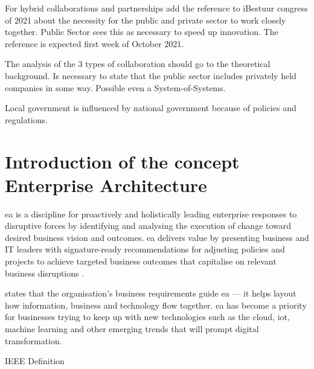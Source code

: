 \begin{remark}
	For hybrid collaborations and partnerships add the reference to iBestuur congress of 2021 about the necessity for the public and private sector to work closely together. Public Sector sees this as necessary to speed up innovation. The reference is expected first week of October 2021.
\end{remark}

\begin{remark}
	The analysis of the 3 types of collaboration should go to the theoretical background. Is necessary to state that the public sector includes privately held companies in some way. Possible even a System-of-Systems.
\end{remark}

\begin{remark}
	Local government is influenced by national government because of policies and regulations.
\end{remark}

\section{Introduction of the concept Enterprise Architecture}
\label{introea}
\acrfull{ea} is a discipline for proactively and holistically leading enterprise responses to disruptive forces by identifying and analysing the execution of change toward desired business vision and outcomes. \acrshort{ea} delivers value by presenting business and IT leaders with signature-ready recommendations for adjusting policies and projects to achieve targeted business outcomes that capitalise on relevant business disruptions \parencite{Gartner}.

\textcite{White2018} states that the organisation’s business requirements guide \acrshort{ea} — it helps layout how information, business and technology flow together. \acrshort{ea} has become a priority for businesses trying to keep up with new technologies such as the cloud, \acrfull{iot}, machine learning and other emerging trends that will prompt digital transformation.

IEEE Definition


